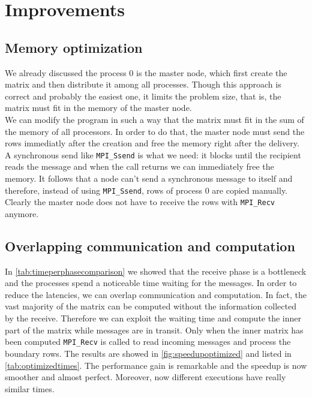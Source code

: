 \documentclass{article}
\begin{document}
\section{Improvements}

\subsection{Memory optimization}
We already discussed the process 0 is the master node, which first create the matrix and then distribute it among all processes. Though this approach is correct and probably the easiest one, it limits the problem size, that is, the matrix must fit in the memory of the master node. \\
We can modify the program in such a way that the matrix must fit in the sum of the memory of all processors. In order to do that, the master node must send the rows immediatly after the creation and free the memory right after the delivery. A synchronous send like \texttt{MPI\_Ssend} is what we need: it blocks until the recipient reads the message and when the call returns we can immediately free the memory. It follows that a node can't send a synchronous message to itself and therefore, instead of using \texttt{MPI\_Ssend}, rows of process 0 are copied manually. Clearly the master node does not have to receive the rows with \texttt{MPI\_Recv} anymore.


\subsection{Overlapping communication and computation} \label{sec:overlappingcommcomp}
In \autoref{tab:timeperphasecomparison} we showed that the receive phase is a bottleneck and the processes spend a noticeable time waiting for the messages. In order to reduce the latencies, we can overlap communication and computation. In fact, the vast majority of the matrix can be computed without the information collected by the receive. Therefore we can exploit the waiting time and compute the inner part of the matrix while messages are in transit. Only when the inner matrix has been computed \texttt{MPI\_Recv} is called to read incoming messages and process the boundary rows. The results are showed in \autoref{fig:speedupoptimized} and listed in \autoref{tab:optimizedtimes}. The performance gain is remarkable and the speedup is now smoother and almost perfect. Moreover, now different executions have really similar times.
\end{document}
